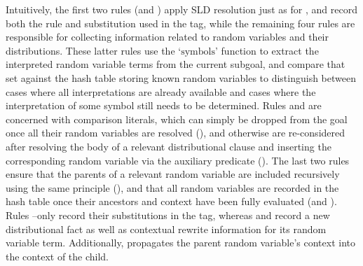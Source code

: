 Intuitively, the first two rules (\rposlit and \rneglit) apply SLD resolution just as for \problogsty, and record both the rule and substitution used in the tag, while the remaining four rules are responsible for collecting information related to random variables and their distributions. These latter rules use the `$\mathrm{symbols}$' function to extract the interpreted random variable terms from the current subgoal, and compare that set against the hash table storing known random variables to distinguish between cases where all interpretations are already available and cases where the interpretation of some symbol still needs to be determined. Rules \rcompone and \rcomptwo are concerned with comparison literals, which can simply be dropped from the goal once all their random variables are resolved (\rcomptwo), and otherwise are re-considered after resolving the body of a relevant distributional clause and inserting the corresponding random variable via the auxiliary predicate (\rcompone). The last two rules ensure that the parents of a relevant random variable are included recursively using the same principle (\rrvtwo), and that all random variables are recorded in the hash table once their ancestors and context have been fully evaluated (\rrvonea and \rrvoneb). Rules \rcompone--\rrvtwo only record their substitutions in the tag, whereas \rrvonea and \rrvoneb record a new distributional fact as well as contextual rewrite information for its random variable term.  Additionally, \rrvonea propagates the parent random variable's context into the context of the child. 




